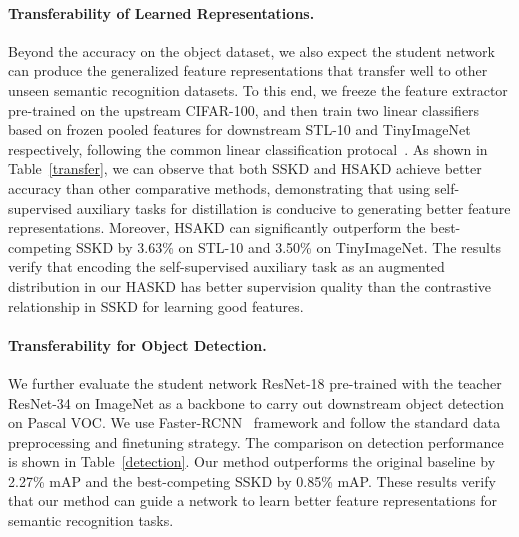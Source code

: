 \documentclass{article}
\begin{document}
\paragraph{Transferability of Learned Representations.} Beyond the accuracy on the object dataset, we also expect the student network can produce the generalized feature representations that transfer well to other unseen semantic recognition datasets. To this end, we freeze the feature extractor pre-trained on the upstream CIFAR-100, and then train two linear classifiers based on frozen pooled features for downstream STL-10 and TinyImageNet respectively, following the common linear classification protocal~\cite{tian2019contrastive}. As shown in Table~\ref{transfer}, we can observe that both SSKD and HSAKD achieve better accuracy than other comparative methods, demonstrating that using self-supervised auxiliary tasks for distillation is conducive to generating better feature representations. Moreover, HSAKD can significantly outperform the best-competing SSKD by 3.63\% on STL-10 and 3.50\% on TinyImageNet. The results verify that encoding the self-supervised auxiliary task as an augmented distribution in our HASKD  has better supervision quality than the contrastive relationship in SSKD for learning good features.

\paragraph{Transferability for Object Detection.} We further evaluate the student network ResNet-18 pre-trained with the teacher ResNet-34 on ImageNet as a backbone to carry out downstream object detection on Pascal VOC. We use Faster-RCNN~\cite{ren2016faster} framework and follow the standard data preprocessing and finetuning strategy. The comparison on detection performance is shown in Table~\ref{detection}.  Our method outperforms the original baseline by 2.27\% mAP and the best-competing SSKD by 0.85\% mAP. These results verify that our method can guide a network to learn better feature representations for semantic recognition tasks.
\begin{table}
	\centering
	\caption{Top-1 accuracy (\%) comparison on CIFAR-100 under few-shot scenario with various percentages of training samples. We use the ResNet56-ResNet20 as the teacher-student pair for evaluation.}
	\label{few_shot}
\end{table}
\end{document}

